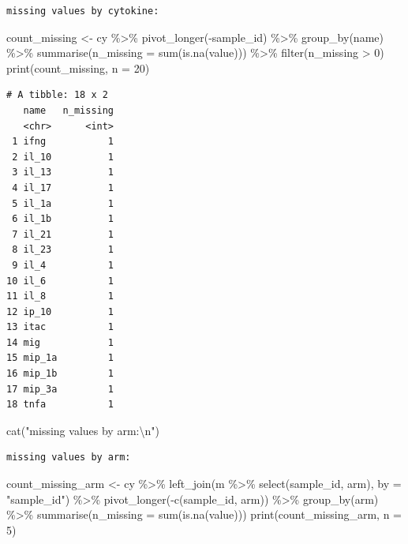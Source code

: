 \documentclass[
  letterpaper,
  DIV=11,
  numbers=noendperiod]{scrartcl}
\newenvironment{Shaded}{\begin{snugshade}}{\end{snugshade}}
\newcommand{\AttributeTok}[1]{\textcolor[rgb]{0.40,0.45,0.13}{#1}}
\newcommand{\DecValTok}[1]{\textcolor[rgb]{0.68,0.00,0.00}{#1}}
\newcommand{\FunctionTok}[1]{\textcolor[rgb]{0.28,0.35,0.67}{#1}}
\newcommand{\NormalTok}[1]{\textcolor[rgb]{0.00,0.23,0.31}{#1}}
\newcommand{\OtherTok}[1]{\textcolor[rgb]{0.00,0.23,0.31}{#1}}
\newcommand{\SpecialCharTok}[1]{\textcolor[rgb]{0.37,0.37,0.37}{#1}}
\newcommand{\StringTok}[1]{\textcolor[rgb]{0.13,0.47,0.30}{#1}}
\begin{document}
\begin{verbatim}
missing values by cytokine:
\end{verbatim}

\begin{Shaded}
\begin{Highlighting}[]
\NormalTok{count\_missing }\OtherTok{\textless{}{-}}\NormalTok{ cy }\SpecialCharTok{\%\textgreater{}\%}
  \FunctionTok{pivot\_longer}\NormalTok{(}\SpecialCharTok{{-}}\NormalTok{sample\_id) }\SpecialCharTok{\%\textgreater{}\%}
  \FunctionTok{group\_by}\NormalTok{(name) }\SpecialCharTok{\%\textgreater{}\%}
  \FunctionTok{summarise}\NormalTok{(}\AttributeTok{n\_missing =} \FunctionTok{sum}\NormalTok{(}\FunctionTok{is.na}\NormalTok{(value))) }\SpecialCharTok{\%\textgreater{}\%}
  \FunctionTok{filter}\NormalTok{(n\_missing }\SpecialCharTok{\textgreater{}} \DecValTok{0}\NormalTok{)}
\FunctionTok{print}\NormalTok{(count\_missing, }\AttributeTok{n =} \DecValTok{20}\NormalTok{)}
\end{Highlighting}
\end{Shaded}

\begin{verbatim}
# A tibble: 18 x 2
   name   n_missing
   <chr>      <int>
 1 ifng           1
 2 il_10          1
 3 il_13          1
 4 il_17          1
 5 il_1a          1
 6 il_1b          1
 7 il_21          1
 8 il_23          1
 9 il_4           1
10 il_6           1
11 il_8           1
12 ip_10          1
13 itac           1
14 mig            1
15 mip_1a         1
16 mip_1b         1
17 mip_3a         1
18 tnfa           1
\end{verbatim}

\begin{Shaded}
\begin{Highlighting}[]
\FunctionTok{cat}\NormalTok{(}\StringTok{"missing values by arm:}\SpecialCharTok{\textbackslash{}n}\StringTok{"}\NormalTok{)}
\end{Highlighting}
\end{Shaded}

\begin{verbatim}
missing values by arm:
\end{verbatim}

\begin{Shaded}
\begin{Highlighting}[]
\NormalTok{count\_missing\_arm }\OtherTok{\textless{}{-}}\NormalTok{ cy }\SpecialCharTok{\%\textgreater{}\%}
  \FunctionTok{left\_join}\NormalTok{(m }\SpecialCharTok{\%\textgreater{}\%} \FunctionTok{select}\NormalTok{(sample\_id, arm), }\AttributeTok{by =} \StringTok{"sample\_id"}\NormalTok{) }\SpecialCharTok{\%\textgreater{}\%}
  \FunctionTok{pivot\_longer}\NormalTok{(}\SpecialCharTok{{-}}\FunctionTok{c}\NormalTok{(sample\_id, arm)) }\SpecialCharTok{\%\textgreater{}\%}
  \FunctionTok{group\_by}\NormalTok{(arm) }\SpecialCharTok{\%\textgreater{}\%}
  \FunctionTok{summarise}\NormalTok{(}\AttributeTok{n\_missing =} \FunctionTok{sum}\NormalTok{(}\FunctionTok{is.na}\NormalTok{(value)))}
\FunctionTok{print}\NormalTok{(count\_missing\_arm, }\AttributeTok{n =} \DecValTok{5}\NormalTok{)}
\end{Highlighting}
\end{Shaded}
\end{document}
